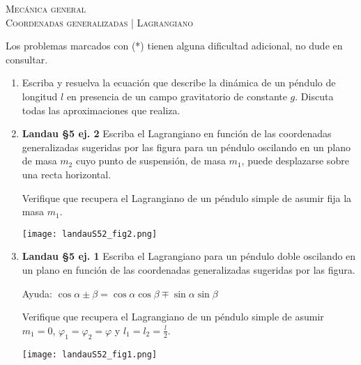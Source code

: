 \documentclass[11pt,spanish,a4paper]{article}
\begin{document}
\begin{center}
  \textsc{\large Mecánica general}\\
  \textsc{\large Coordenadas generalizadas | Lagrangiano}
\end{center}

\noindent
Los problemas marcados con (*) tienen alguna dificultad adicional, no dude en consultar.
\begin{enumerate}


\item Escriba y resuelva la ecuación que describe la dinámica de un péndulo de longitud $l$ en presencia de un campo gravitatorio de constante $g$. Discuta todas las aproximaciones que realiza.



\item \begin{minipage}[t][3.5cm]{0.7\textwidth}
\textbf{Landau \S5 ej. 2}
Escriba el Lagrangiano en función de las coordenadas generalizadas sugeridas por las figura para un péndulo oscilando en un plano de masa \(m_2\) cuyo punto de suspensión, de masa \(m_1\), puede desplazarse sobre una recta horizontal.

Verifique que recupera el Lagrangiano de un péndulo simple de asumir fija la masa \(m_1\).
\end{minipage}
	\begin{minipage}[c][1cm][t]{0.3\textwidth}
        \texttt{[image: landauS52\_fig2.png]}
\end{minipage}




\item \begin{minipage}[t][4.5cm]{0.7\textwidth}
\textbf{Landau \S5 ej. 1}
Escriba el Lagrangiano para un péndulo doble oscilando en un plano en función de las coordenadas generalizadas sugeridas por las figura.

Ayuda: \( \cos{\alpha \pm \beta }=\cos{ \alpha} \cos{ \beta \mp \sin \alpha} \sin{ \beta } \)

Verifique que recupera el Lagrangiano de un péndulo simple de asumir \(m_1=0\), \(\varphi_1 = \varphi_2 = \varphi\) y \(l_1 = l_2 = \frac{l}{2}\).
\end{minipage}
	\begin{minipage}[c][2.5cm][t]{0.3\textwidth}
	\texttt{[image: landauS52\_fig1.png]}
\end{minipage}




\end{enumerate}
\end{document}
